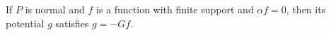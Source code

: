 If $P$ is normal and $f$ is a function with finite support and $\alpha f = 0$, then its potential $g$ satisfies $g = -Gf$.
